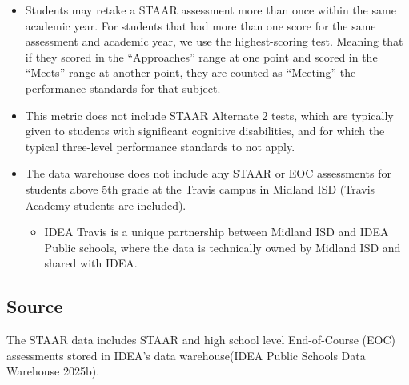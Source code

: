 \documentclass[
  letterpaper,
  DIV=11,
  numbers=noendperiod]{scrreprt}
\providecommand{\tightlist}{%
  \setlength{\itemsep}{0pt}\setlength{\parskip}{0pt}}
\begin{document}
\begin{itemize}
\item
  Students may retake a STAAR assessment more than once within the same
  academic year. For students that had more than one score for the same
  assessment and academic year, we use the highest-scoring test. Meaning
  that if they scored in the ``Approaches'' range at one point and
  scored in the ``Meets'' range at another point, they are counted as
  ``Meeting'' the performance standards for that subject.
\item
  This metric does not include STAAR Alternate 2 tests, which are
  typically given to students with significant cognitive disabilities,
  and for which the typical three-level performance standards to not
  apply.
\item
  The data warehouse does not include any STAAR or EOC assessments for
  students above 5th grade at the Travis campus in Midland ISD (Travis
  Academy students are included).

  \begin{itemize}
  \tightlist
  \item
    IDEA Travis is a unique partnership between Midland ISD and IDEA
    Public schools, where the data is technically owned by Midland ISD
    and shared with IDEA.
  \end{itemize}
\end{itemize}

\subsection{Source}\label{source}

The STAAR data includes STAAR and high school level End-of-Course (EOC)
assessments stored in IDEA's data warehouse(IDEA Public Schools Data
Warehouse 2025b).
\end{document}
